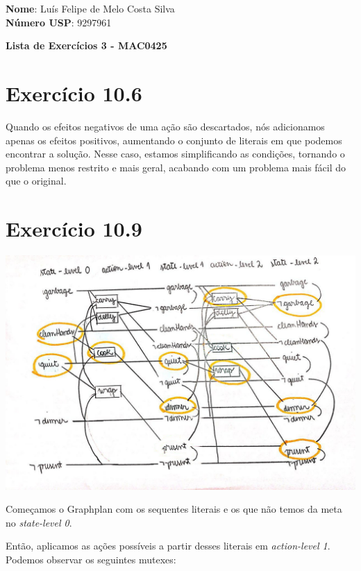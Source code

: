 \documentclass[12pt,letterpaper]{article}
\begin{document}
	\large \textbf{Nome}: Luís Felipe de Melo Costa Silva \\
	\textbf{Número USP}: 9297961

	\begin{center}
		\LARGE \bf
		Lista de Exercícios 3 - MAC0425
	\end{center}

	\section*{Exercício 10.6}

	Quando os efeitos negativos de uma ação são descartados, nós adicionamos apenas os efeitos positivos, aumentando o conjunto de literais em que podemos encontrar a solução. Nesse caso, estamos simplificando as condições, tornando o problema menos restrito e mais geral, acabando com um problema mais fácil do que o original.

	\section*{Exercício 10.9}

	\includegraphics[width=\textwidth]{graphplan.jpg}

	Começamos o Graphplan com os sequentes literais e os que não temos da meta no \textit{state-level 0}.
	
	Então, aplicamos as ações possíveis a partir desses literais em \textit{action-level 1}. Podemos observar os seguintes mutexes:
\end{document}
